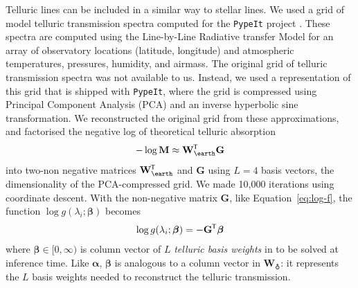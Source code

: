 \documentclass[modern,linenumbers]{aastex631}
\renewcommand{\vec}[1]{\mathbf{#1}}
\newcommand{\vecalpha}{\boldsymbol{\alpha}}
\newcommand{\vecbeta}{\boldsymbol{\beta}}
\newcommand*{\transpose}{^{\mkern-1.5mu\mathsf{T}}}
\newcommand{\todo}[1]{\textcolor{tab:red}{#1}}
\renewcommand{\added}[1]{#1}
\newcommand{\removed}[1]{}
\begin{document}
Telluric lines can be included in a similar way to stellar lines. We used a grid of model telluric transmission spectra computed for the \texttt{PypeIt} project \citep{pypeit}. These spectra are computed using the Line-by-Line Radiative transfer Model \citep{lblrm} for an array of observatory locations (latitude, longitude) and atmospheric temperatures, pressures, humidity, and airmass. The original grid of telluric transmission spectra was not available to us. Instead, we used a representation of this grid that is shipped with \texttt{PypeIt}, where the grid is compressed using Principal Component Analysis (PCA) and an inverse hyperbolic sine transformation. We reconstructed the original grid from these approximations, and factorised the negative log of theoretical telluric absorption
\begin{eqnarray}
    -\log\vec{M} \approx \vec{W}\transpose_\earth\vec{G}
\end{eqnarray}
\noindent{}into two-non negative matrices $\vec{W}\transpose_\earth$ and $\vec{G}$ using $L = 4$ basis vectors\added{, the dimensionality of the PCA-compressed grid}. We made {10,000} iterations using coordinate descent. With the non-negative matrix $\vec{G}$\added{, like Equation~\ref{eq:log-f},} the function $\log{g\left(\lambda_i;\vecbeta\right)}$ \added{becomes}\removed{is simply}
\begin{eqnarray}
    \log{g(\lambda_i;\vecbeta)} = -\vec{G}\transpose\vecbeta \label{eq:log-g}
\end{eqnarray}
where $\vecbeta \in [0, \infty)$ is column vector of $L$ \emph{telluric basis weights} in to be solved at inference time.
Like $\vecalpha$, $\vecbeta$ is analogous to a column \added{vector} in $\vec{W}_\earth$: it represents the $L$ basis weights needed to reconstruct the telluric transmission.\\
\end{document}
